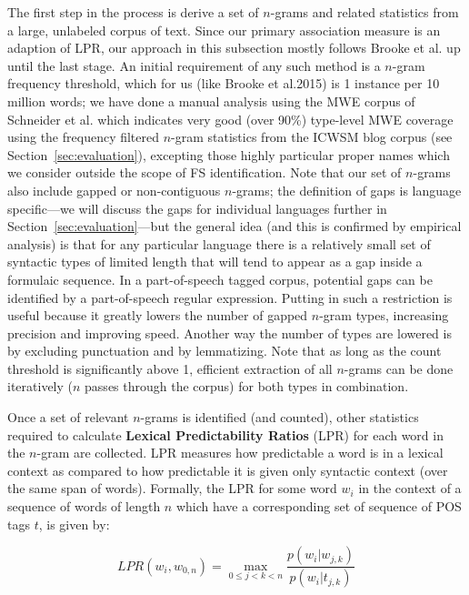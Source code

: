 \documentclass[11pt]{article}
\makeatletter
\def \al {al.\@ }
\newcommand{\termdef}[1]{\textbf{#1}\xspace}
\newcommand{\secref}[2][]{Section#1~\ref{#2}\xspace}
\makeatother
\begin{document}
The first step in the process is derive a set of $n$-grams and related statistics from a large, unlabeled corpus of text. Since our primary association measure is an adaption of LPR, our approach in this subsection mostly follows Brooke et \al {} up until the last stage. An initial requirement of any such method is a $n$-gram frequency threshold, which for us (like Brooke et \al 2015) is 1 instance per 10 million words; we have done a manual analysis using the MWE corpus of Schneider et \al {} which indicates very good (over 90\%) type-level MWE coverage using the frequency filtered $n$-gram statistics from the ICWSM blog corpus (see \secref{sec:evaluation}), excepting those highly particular proper names which we consider outside the scope of FS identification. Note that our set of $n$-grams also include gapped or non-contiguous $n$-grams; the definition of gaps is language specific---we will discuss the gaps for individual languages further in \secref{sec:evaluation}---but the general idea (and this is confirmed by empirical analysis) is that for any particular language there is a relatively small set of syntactic types of limited length that will tend to appear as a gap inside a formulaic sequence. In a part-of-speech tagged corpus, potential gaps can be identified by a part-of-speech regular expression. Putting in such a restriction is useful because it greatly lowers the number of gapped $n$-gram types, increasing precision and improving speed. Another way the number of types are lowered is by excluding punctuation and by lemmatizing.  Note that as long as the count threshold is significantly above 1, efficient extraction of all $n$-grams can be done iteratively ($n$ passes through the corpus) for both types in combination. 

Once a set of relevant $n$-grams is identified (and counted), other statistics required to calculate \termdef{Lexical Predictability Ratios} (LPR) for each word in the $n$-gram are collected. LPR measures how predictable a word is in a lexical context as compared to how predictable it is given only syntactic context (over the same span of words). Formally, the LPR for some word $w_i$ in the context of a sequence of words of length $n$ which have a corresponding set of sequence of POS tags $t$, is given by:

\begin{displaymath}
LPR(w_i,w_{0,n}) = \max_{0 \leq j < k < n }{\frac{p(w_i|w_{j,k})}{p(w_i|t_{j,k})}}
\end{displaymath}
\end{document}
